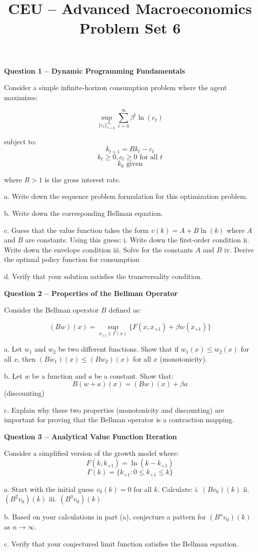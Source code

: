 \documentclass[12pt]{article}
\title{CEU -- Advanced Macroeconomics\\Problem Set 6}
\author{}
\date{}
\theoremstyle{definition}
\begin{document}
\maketitle

\noindent\textbf{Question 1 -- Dynamic Programming Fundamentals}

Consider a simple infinite-horizon consumption problem where the agent maximizes:

\[
\sup_{\{c_t\}_{t=0}^{\infty}} \sum_{t=0}^{\infty} \beta^t \ln(c_t)
\]

subject to:
\[
k_{t+1} = Rk_t - c_t
\]
\[
k_t \geq 0, c_t \geq 0 \text{ for all } t
\]
\[
k_0 \text{ given}
\]

where $R > 1$ is the gross interest rate.

a. Write down the sequence problem formulation for this optimization problem.

b. Write down the corresponding Bellman equation.

c. Guess that the value function takes the form $v(k) = A + B\ln(k)$ where $A$ and $B$ are constants. Using this guess:
   i. Write down the first-order condition
   ii. Write down the envelope condition
   iii. Solve for the constants $A$ and $B$
   iv. Derive the optimal policy function for consumption

d. Verify that your solution satisfies the transversality condition.

\vspace{0.5cm}
\noindent\textbf{Question 2 -- Properties of the Bellman Operator}

Consider the Bellman operator $B$ defined as:

\[
(Bw)(x) = \sup_{x_{+1} \in \Gamma(x)} \{F(x,x_{+1}) + \beta w(x_{+1})\}
\]

a. Let $w_1$ and $w_2$ be two different functions. Show that if $w_1(x) \leq w_2(x)$ for all $x$, then $(Bw_1)(x) \leq (Bw_2)(x)$ for all $x$ (monotonicity).

b. Let $w$ be a function and $a$ be a constant. Show that:
\[
B(w + a)(x) = (Bw)(x) + \beta a
\]
(discounting)

c. Explain why these two properties (monotonicity and discounting) are important for proving that the Bellman operator is a contraction mapping.

\vspace{0.5cm}
\noindent\textbf{Question 3 -- Analytical Value Function Iteration}

Consider a simplified version of the growth model where:
\[
F(k,k_{+1}) = \ln(k - k_{+1})
\]
\[
\Gamma(k) = \{k_{+1}: 0 \leq k_{+1} \leq k\}
\]

a. Start with the initial guess $v_0(k) = 0$ for all $k$. Calculate:
   i. $(Bv_0)(k)$
   ii. $(B^2v_0)(k)$
   iii. $(B^3v_0)(k)$

b. Based on your calculations in part (a), conjecture a pattern for $(B^nv_0)(k)$ as $n \to \infty$.

c. Verify that your conjectured limit function satisfies the Bellman equation.
\end{document}

